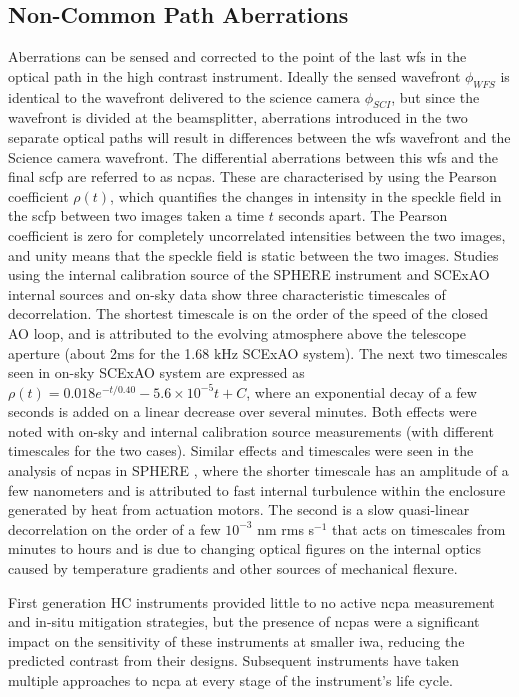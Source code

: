 \documentclass[letterpaper]{ar-1col}
\begin{document}
\subsection{Non-Common Path Aberrations}

Aberrations can be sensed and corrected to the point of the last \ac{wfs} in the optical path in the high contrast instrument.
%
Ideally the sensed wavefront $\phi_{WFS}$ is identical to the wavefront delivered to the science camera $\phi_{SCI}$, but since the wavefront is divided at the beamsplitter, aberrations introduced in the two separate optical paths will result in differences between the \ac{wfs} wavefront and the Science camera wavefront.
%
The differential aberrations between this \ac{wfs} and the final \ac{scfp} are referred to as \acp{ncpa}.
%
These are characterised by using the Pearson coefficient $\rho(t)$, which quantifies the changes in intensity in the speckle field in the \ac{scfp} between two images taken a time $t$ seconds apart.
%
The Pearson coefficient is zero for completely uncorrelated intensities between the two images, and unity means that the speckle field is static between the two images.
%
Studies using the internal calibration source of the SPHERE instrument \citep{Martinez12,Milli18,Vigan22} and SCExAO internal sources and on-sky data \citep{Goebel18} show three characteristic timescales of decorrelation.
%
The shortest timescale is on the order of the speed of the closed AO loop, and is attributed to the evolving atmosphere above the telescope aperture (about 2ms for the 1.68 kHz SCExAO system).
%
The next two timescales seen in on-sky SCExAO system are expressed as $\rho(t)=0.018 e^{-t/0.40}-5.6\times 10^{-5}t + C$, where an exponential decay of a few seconds is added on a linear decrease over several minutes.
%
Both effects were noted with on-sky and internal calibration source measurements (with different timescales for the two cases).
%
Similar effects and timescales were seen in the analysis of \acp{ncpa} in SPHERE \citep{Vigan22}, where the shorter timescale has an amplitude of a few nanometers and is attributed to fast internal turbulence within the enclosure generated by heat from actuation motors.
%
The second is a slow quasi-linear decorrelation on the order of a few $10^{-3}$ nm rms s$^{-1}$ that acts on timescales from minutes to hours and is due to changing optical figures on the internal optics caused by temperature gradients and other sources of mechanical flexure.

First generation HC instruments provided little to no active \ac{ncpa} measurement and in-situ mitigation strategies, but the presence of \acp{ncpa} were a significant impact on the sensitivity of these instruments at smaller \ac{iwa}, reducing the predicted contrast from their designs.
%
Subsequent instruments have taken multiple approaches to \ac{ncpa} at every stage of the instrument's life cycle.
\end{document}
